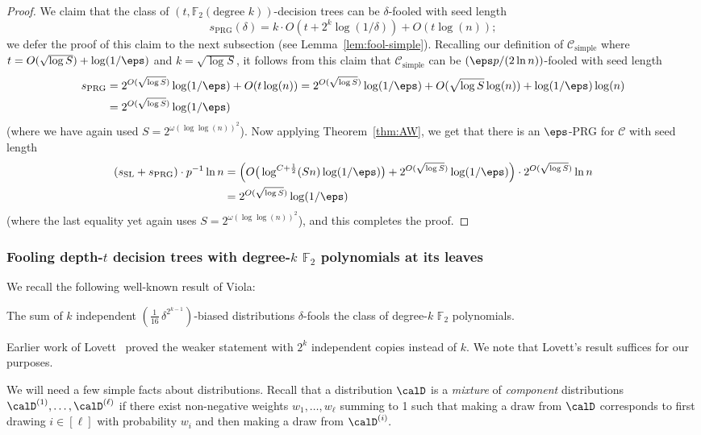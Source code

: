 \documentclass{toc}
\theoremstyle{plain}
\newcommand{\simple}{\mathrm{simple}}
\newcommand{\PRG}{\mathrm{PRG}}
\newcommand{\SL}{\mathrm{SL}}
\renewcommand{\F}{\mathds{F}}
\begin{document}
\begin{proof}
 
We claim that the class of $(t,\F_2(\text{degree $k$}))$-decision trees can be $\delta$-fooled with seed length 
\[ s_\PRG(\delta) =  k \cdot O(t + 2^k\log(1/\delta)) + O(t \log(n)); \]
we defer the proof of this claim to the next subsection (see Lemma~\ref{lem:fool-simple}).   Recalling our definition of $\mathscr{C}_\simple$ where $t = O(\sqrt{\log S}) + \log(1/\eps)$ and $k = \sqrt{\log S}$, it follows from this claim that $\mathscr{C}_\simple$ can be $(\eps p/(2\ln n))$-fooled with seed length 
\begin{align*}s_\PRG &= 2^{O(\sqrt{\log S})} \log(1/\eps)
+ O(t \log(n)) = 2^{O(\sqrt{\log S})} \log(1/\eps) + O(\sqrt{\log S} \log(n)) + \log(1/\eps) \log(n)\\
&=2^{O(\sqrt{\log S})} \log(1/\eps)
\end{align*}
(where we have again used $S = 2^{\omega(\log \log(n))^2}$).
Now applying Theorem~\ref{thm:AW}, we get that there is an $\eps$-PRG for $\mathscr{C}$ with seed length 
\begin{align*}
(s_\SL + s_\PRG) \cdot p^{-1}\ln n &= \Big(O\big( \log^{C+\frac1{2}}(Sn) \log(1/\eps)\big) + 2^{O(\sqrt{\log S})}\log(1/\eps)\Big) \cdot 2^{O(\sqrt{\log S})} \ln n \\
&= 2^{O(\sqrt{\log S})} \log(1/\eps)
\end{align*} 
(where the last equality yet again uses $S = 2^{\omega(\log \log(n))^2}$),
and this completes the proof. 
 \end{proof} 







\subsubsection{Fooling depth-$t$ decision trees with degree-$k$ $\F_2$ polynomials at its leaves} 

We recall the following well-known result of Viola:
\begin{theorem} 
\label{thm:viola}
The sum of $k$ independent $(\frac1{16}\, \delta^{2^{k-1}})$-biased distributions $\delta$-fools the class of degree-$k$ $\F_2$ polynomials. 
\end{theorem}

Earlier work of Lovett~\cite{Lov09} proved the weaker statement with $2^k$ independent copies instead of $k$. We note that Lovett's result suffices for our purposes. 

We will need a few simple facts about distributions. Recall that a distribution $\calD$ is a \emph{mixture} of
\emph{component} distributions $\calD^{(1)},\dots,\calD^{(\ell)}$ if there exist non-negative weights $w_1,\dots,w_\ell$ summing to 1 such that making a draw
from $\calD$ corresponds to first drawing $i \in [\ell]$ with probability $w_i$ and then making a draw from $\calD^{(i)}.$
\end{document}
